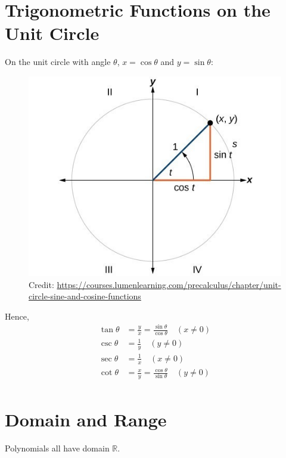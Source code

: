 \documentclass[12pt]{article}
\begin{document}
\section{Trigonometric Functions on the Unit Circle}

On the unit circle with angle \(\theta\), \(x=\cos\theta\) and \(y=\sin\theta\):\\

\begin{figure}[H]
	\centering
	\includegraphics[scale=0.5]{CNX_Precalc_Figure_05_02_0022.jpg}
	\caption{Credit: \url{https://courses.lumenlearning.com/precalculus/chapter/unit-circle-sine-and-cosine-functions}}
\end{figure}

Hence, \\

\begin{align*}
\tan\theta &= \frac{y}{x} = \frac{\sin\theta}{\cos\theta} \quad (x \neq 0) \\
\csc\theta &= \frac{1}{y} \quad (y \neq 0) \\
\sec\theta &= \frac{1}{x} \quad (x \neq 0) \\
\cot\theta &= \frac{x}{y} =  \frac{\cos\theta}{\sin\theta} \quad (y \neq 0) \\
\end{align*}

\section{Domain and Range}

Polynomials all have domain \(\mathbb{R}\).\\
\end{document}
